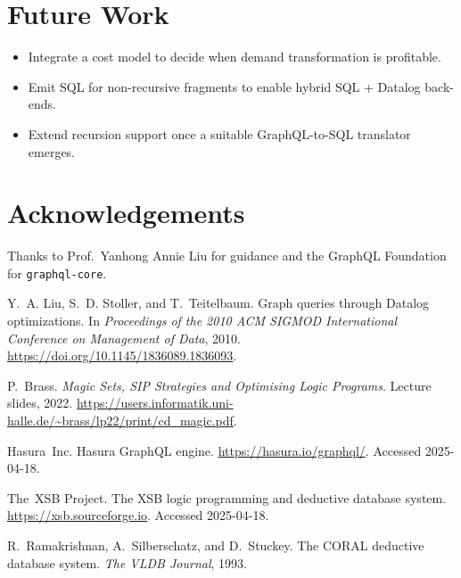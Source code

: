 \documentclass[11pt]{article}
\begin{document}
\section{Future Work}
\begin{itemize}[leftmargin=1.5em]
  \item Integrate a cost model to decide when demand transformation is profitable.
  \item Emit SQL for non-recursive fragments to enable hybrid SQL + Datalog back-ends.
  \item Extend recursion support once a suitable GraphQL-to-SQL translator emerges.
\end{itemize}

\section*{Acknowledgements}
Thanks to Prof.\ Yanhong Annie Liu for guidance and the GraphQL Foundation for
\texttt{graphql-core}.


\begin{thebibliography}{10}\small

Y.~A. Liu, S.~D. Stoller, and T.~Teitelbaum.
\newblock Graph queries through Datalog optimizations.
\newblock In \emph{Proceedings of the 2010 ACM SIGMOD International Conference
  on Management of Data}, 2010.
  \url{https://doi.org/10.1145/1836089.1836093}.

P.~Brass.
\newblock \emph{Magic Sets, SIP Strategies and Optimising Logic Programs}.
\newblock Lecture slides, 2022.
\newblock \url{https://users.informatik.uni-halle.de/~brass/lp22/print/cd_magic.pdf}.

Hasura~Inc.
\newblock Hasura GraphQL engine.
\newblock \url{https://hasura.io/graphql/}. Accessed 2025-04-18.

The~XSB Project.
\newblock The {XSB} logic programming and deductive database system.
\newblock \url{https://xsb.sourceforge.io}. Accessed 2025-04-18.

R.~Ramakrishnan, A.~Silberschatz, and D.~Stuckey.
\newblock The {CORAL} deductive database system.
\newblock \emph{The VLDB Journal}, 1993.

\end{thebibliography}
\end{document}
